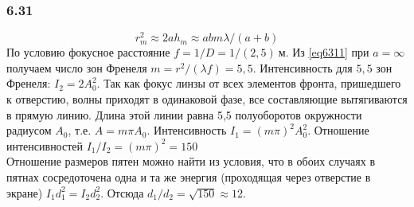 \subsubsection*{6.31}
\begin{equation}\label{eq6311}
	r^2_m \approx 2ah_m \approx abm \lambda / (a + b)
\end{equation}
По условию фокусное расстояние $f = 1/D = 1/(2,5)\ м$. Из {\ref{eq6311}} при $a = \infty$ получаем число зон Френеля $m = r^2 / (\lambda f) = 5,5$. Интенсивность для $5,5$ зон Френеля: $I_2 = 2A_0^2$. Так как фокус линзы от всех элементов фронта, пришедшего  к отверстию, волны приходят в одинаковой фазе, все составляющие вытягиваются в прямую линию. Длина этой линии равна 5,5 полуоборотов окружности радиусом $A_0$, т.е. $A=m\pi A_0$. Интенсивность $I_1 = (m\pi)^2A_0^2$. Отношение интенсивностей $I_1/I_2 = (m\pi)^2 = 150$\\
Отношение размеров пятен можно найти из условия, что в обоих случаях в пятнах сосредоточена одна и та же энергия (проходящая через отверстие в экране) $I_1 d_1^2 = I_2 d_2^2$. Отсюда $d_1/d_2  = \sqrt{150} \approx 12$.
